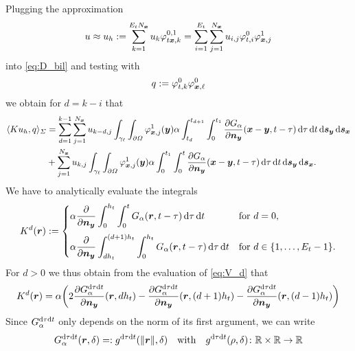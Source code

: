 \documentclass[a4paper,11pt]{article}
\begin{document}
Plugging the approximation
\begin{equation*}
 u \approx u_h := \sum_{k=1}^{E_t N_{{\bm{x}}}} u_k \varphi^{0,1}_{t{{\bm{x}}},k} = \sum_{i=1}^{E_t} \sum_{j=1}^{N_{{\bm{x}}}} u_{i,j} \varphi^0_{t,i} \varphi^1_{{{\bm{x}}},j}
\end{equation*}
into \eqref{eq:D_bil} and testing with
\begin{equation*}
  q := \varphi^0_{t,k} \varphi^0_{{{\bm{x}}},\ell}
\end{equation*}
we obtain for $d=k-i$ that
\begin{align*}
  \langle Ku_h, q \rangle_\Sigma &= \sum_{d=1}^{k-1} \sum_{j=1}^{N_{{\bm{x}}}} u_{k-d,j} \int_{\gamma_\ell} \int_{\partial\Omega} \varphi^1_{{{\bm{x}}},j}({{\bm{y}}}) \alpha \int_{t_d}^{t_{d+1}} \int_{0}^{t_1} \frac{\partial G_\alpha}{\partial {\ensuremath{{\bm{n}}}}_{{\bm{y}}}}({{\bm{x}}}-{{\bm{y}}},t-\tau) \,{\mathrm{d}}\tau \,{\mathrm{d}} t \,{\mathrm{d}}{{\bm{s}}}_{{\bm{y}}} \,{\mathrm{d}}{{\bm{s}}}_{{\bm{x}}} \\
  &+ \sum_{j=1}^{N_{{\bm{x}}}} u_{k,j} \int_{\gamma_\ell} \int_{\partial\Omega} \varphi^1_{{{\bm{x}}},j}({{\bm{y}}}) \alpha \int_{0}^{t_1} \int_{0}^{t} \frac{\partial G_\alpha}{\partial {\ensuremath{{\bm{n}}}}_{{\bm{y}}}}({{\bm{x}}}-{{\bm{y}}},t-\tau) \,{\mathrm{d}}\tau \,{\mathrm{d}} t \,{\mathrm{d}}{{\bm{s}}}_{{\bm{y}}} \,{\mathrm{d}}{{\bm{s}}}_{{\bm{x}}}.
\end{align*}
We have to analytically evaluate the integrals
\begin{equation*}
  K^d({{\bm{r}}}) := 
  \begin{cases}
  \displaystyle
    \alpha \frac{\partial}{\partial {\ensuremath{{\bm{n}}}}_{{\bm{y}}}} \int_{0}^{h_t} \int_{0}^{t} G_\alpha({{\bm{r}}},t-\tau) \,{\mathrm{d}}\tau \,{\mathrm{d}} t & \text{for } d = 0, \\[4mm]
  \displaystyle
    \alpha \frac{\partial}{\partial {\ensuremath{{\bm{n}}}}_{{\bm{y}}}} \int_{dh_t}^{(d+1)h_t} \int_{0}^{h_t} G_\alpha({{\bm{r}}},t-\tau) \,{\mathrm{d}}\tau \,{\mathrm{d}} t & \text{for } d \in \{1,\ldots,E_t-1\}.
  \end{cases}
\end{equation*}
For $d > 0$ we thus obtain from the evaluation of \eqref{eq:V_d} that
\begin{align*}
  K^d({{\bm{r}}}) = \alpha \bigg( 2 \frac{\partial G^{{\mathrm{d}}\tau{\mathrm{d}} t}_\alpha}{\partial {\ensuremath{{\bm{n}}}}_{{\bm{y}}}} ({{\bm{r}}},dh_t) - \frac{\partial G^{{\mathrm{d}}\tau{\mathrm{d}} t}_\alpha}{\partial {\ensuremath{{\bm{n}}}}_{{\bm{y}}}}({{\bm{r}}},(d+1)h_t) - \frac{\partial G^{{\mathrm{d}}\tau{\mathrm{d}} t}_\alpha}{\partial {\ensuremath{{\bm{n}}}}_{{\bm{y}}}}({{\bm{r}}},(d-1)h_t) \bigg)
\end{align*}
Since $G^{{\mathrm{d}}\tau{\mathrm{d}} t}_\alpha$ only depends on the norm of its first argument, we can write 
\begin{equation}
  \label{eq:G_to_g}
  G^{{\mathrm{d}}\tau{\mathrm{d}} t}_\alpha({{\bm{r}}},\delta) =: g^{{\mathrm{d}}\tau{\mathrm{d}} t}(\|{{\bm{r}}}\|,\delta) \quad\text{with}\quad g^{{\mathrm{d}}\tau{\mathrm{d}} t}(\rho,\delta)\colon {\mathbb{R}}\times{\mathbb{R}}\to{\mathbb{R}}
\end{equation}
\end{document}
